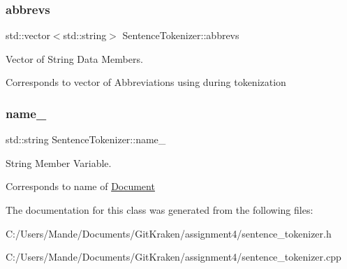 \subsubsection{\texorpdfstring{abbrevs}{abbrevs}}
{\footnotesize\ttfamily std\+::vector$<$std\+::string$>$ Sentence\+Tokenizer\+::abbrevs\hspace{0.3cm}{\ttfamily [private]}}



Vector of String Data Members. 

Corresponds to vector of Abbreviations using during tokenization \mbox{\label{class_sentence_tokenizer_a7c3ce1b9636d33b34aedc21c1b9f552b}} 
\subsubsection{\texorpdfstring{name\+\_\+}{name\_}}
{\footnotesize\ttfamily std\+::string Sentence\+Tokenizer\+::name\+\_\+\hspace{0.3cm}{\ttfamily [private]}}



String Member Variable. 

Corresponds to name of \hyperlink{class_document}{Document} 

The documentation for this class was generated from the following files\+:\begin{DoxyCompactItemize}
\item 
C\+:/\+Users/\+Mande/\+Documents/\+Git\+Kraken/assignment4/sentence\+\_\+tokenizer.\+h\item 
C\+:/\+Users/\+Mande/\+Documents/\+Git\+Kraken/assignment4/sentence\+\_\+tokenizer.\+cpp\end{DoxyCompactItemize}
